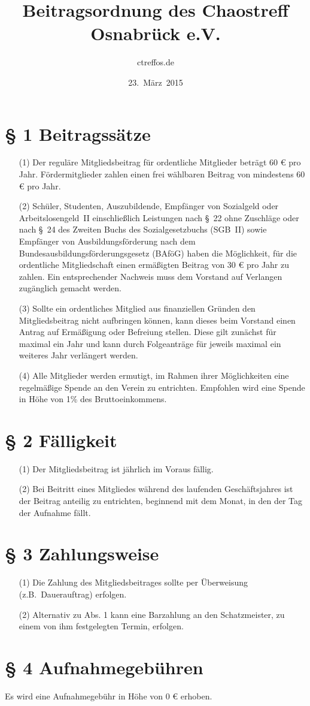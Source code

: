 \documentclass[a4paper,12pt]{scrartcl}
\title{Beitragsordnung des Chaostreff Osnabrück e.V.}
\author{ctreffos.de}
\date{23.~März~2015}
\begin{document}
\maketitle

\section*{\S{} 1 Beitragssätze}
\begin{enumerate}
\item[(1)]
Der reguläre Mitgliedsbeitrag für ordentliche Mitglieder beträgt 60 €
pro Jahr. Fördermitglieder zahlen einen frei wählbaren Beitrag von
mindestens 60 € pro Jahr.
\item[(2)]
Schüler, Studenten, Auszubildende, Empfänger von Sozialgeld oder
Arbeitslosengeld~II einschließlich Leistungen nach §~22 ohne Zuschläge
oder nach §~24 des Zweiten Buchs des Sozialgesetzbuchs (SGB~II) sowie
Empfänger von Ausbildungsförderung nach dem
Bundesausbildungsförderungsgesetz (BAföG) haben die Möglichkeit, für
die ordentliche Mitgliedschaft einen ermäßigten Beitrag von 30 € pro
Jahr zu zahlen. Ein entsprechender Nachweis muss dem Vorstand auf
Verlangen zugänglich gemacht werden.
\item[(3)]
Sollte ein ordentliches Mitglied aus finanziellen Gründen den
Mitgliedsbeitrag nicht aufbringen können, kann dieses beim Vorstand
einen Antrag auf Ermäßigung oder Befreiung stellen. Diese gilt
zunächst für maximal ein Jahr und kann durch Folgeanträge für jeweils
maximal ein weiteres Jahr verlängert werden.
\item[(4)]
Alle Mitglieder werden ermutigt, im Rahmen ihrer Möglichkeiten eine
regelmäßige Spende an den Verein zu entrichten. Empfohlen wird eine
Spende in Höhe von 1\% des Bruttoeinkommens.
\end{enumerate}

\section*{\S{} 2 Fälligkeit}
\begin{enumerate}
\item[(1)]
Der Mitgliedsbeitrag ist jährlich im Voraus fällig.
\item[(2)]
Bei Beitritt eines Mitgliedes während des laufenden Geschäftsjahres ist der Beitrag 
anteilig zu entrichten, beginnend mit dem Monat, in den der Tag der Aufnahme fällt.
\end{enumerate}

\section*{\S{} 3 Zahlungsweise}
\begin{enumerate}
\item[(1)]
Die Zahlung des Mitgliedsbeitrages sollte per Überweisung (z.B.\
Dauerauftrag) erfolgen.
\item[(2)]
Alternativ zu Abs. 1 kann eine Barzahlung an 
den Schatzmeister, zu einem von ihm festgelegten Termin, erfolgen.
\end{enumerate}

\section*{\S{} 4 Aufnahmegebühren}
Es wird eine Aufnahmegebühr in Höhe von 0 € erhoben.
\end{document}
